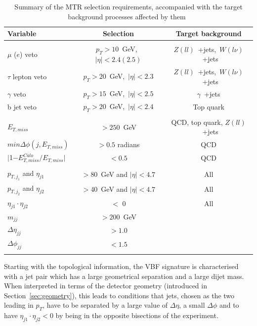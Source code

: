 \begin{table}[htbp]
\centering
\begin{tabular}{lcc}
    Variable                           & Selection                       & Target background \\
    \hline
    & & \\
    $\mu$ ($e$) veto               & $p_T > 10$~GeV,~$|\eta| < 2.4 (2.5)$  & $Z(ll)$~+jets,~$W(l\nu)$~+jets \\
    $\tau$ lepton veto                 & $p_T > 20$~GeV,~$|\eta| < 2.3$        & $Z(ll)$~+jets,~$W(l\nu)$~+jets  \\
    $\gamma$ veto                        & $p_T > 15$~GeV,~$|\eta| < 2.5$        & $\gamma$~+jets \\
    b jet veto                    &  $p_T > 20$~GeV,~$|\eta| < 2.4$  &  Top quark\\
        & & \\
    $E_{T,miss}$                          & ${>} 250$~GeV                          & QCD, top quark, $Z(ll)$~+jets \\
    $min\Delta\phi(j, E_{T,miss})$   &  $ {>} 0.5$ radians               & QCD \\
    $|$1$-E_{T,miss}^{Calo}/E_{T,miss}|$   &  $ {<} 0.5$               & QCD \\
        & & \\
    $p_{T,j_1}$ and $\eta_{j1}$   & ${>} 80$~GeV and $ |\eta| < 4.7$      & All \\
    $p_{T,j_2}$ and $\eta_{j2}$   & ${>} 40$~GeV and $ |\eta| < 4.7$      & All \\
    $\eta_{j1}\cdot\eta_{j2}$   & ${<}$ 0   & All \\

    $m_{jj}$                               & ${>} 200$~GeV  \\       
    $\Delta\eta_{jj}$                            & ${>} 1.0$  \\
    $\Delta\phi_{jj}$                            & ${<} 1.5$  \\
        & & \\
         \hline
\end{tabular}
\caption{Summary of the MTR selection requirements, accompanied with the target background processes affected by them~\cite{note:AN_19_257}}
\label{tab:selection_mtr}
\end{table}

\hspace{10pt} Starting with the topological information, the VBF signature is characterised with a jet pair which has a large geometrical separation and a large dijet mass. When interpreted in terms of the detector geometry (introduced in Section~\ref{sec:geometry}), this leads to conditions that jets, chosen as the two leading in $p_T$, have to be separated by a large value of $\Delta \eta$, a small $\Delta \phi$ and to have $\eta_{j1}\cdot\eta_{j2}<0$ by being in the opposite bisections of the experiment.

